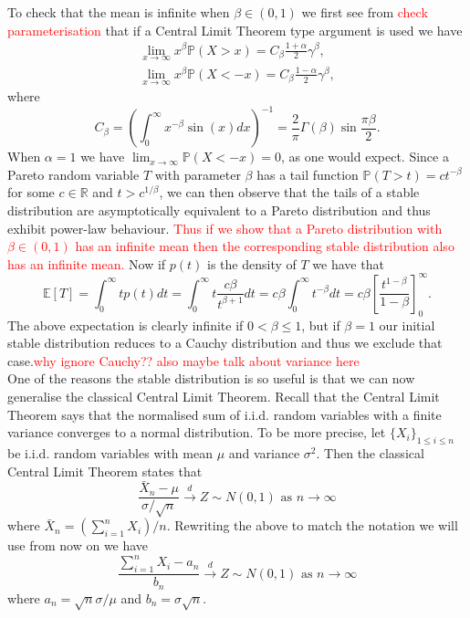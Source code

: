 \documentclass[honours,12pt]{UNSWthesis}
\newcommand{\R}{\mathbb{R}}
\newcommand{\PP}{\mathbb{P}}
\newcommand{\E}{\mathbb{E}}
\newcommand{\1}{\mathbf 1}
\numberwithin{equation}{section}
\theoremstyle{definition}
\theoremstyle{remark}
\begin{document}
\noindent To check that the mean is infinite when $\beta \in (0,1)$ we first see from \cite{JanickiWeron1994}\textcolor{red}{check parameterisation} that if a Central Limit Theorem type argument is used we have
\begin{align}
\lim_{x\to\infty} x^\beta\PP(X>x)=C_\beta\frac{1+\alpha}{2}\gamma^\beta,\\
\lim_{x\to\infty} x^\beta\PP(X<-x)=C_\beta\frac{1-\alpha}{2}\gamma^\beta,
\end{align}
\noindent where
\[
	C_\beta=\left(\int^\infty_0 x^{-\beta} \sin(x) dx  \right)^{-1}=\frac{2}{\pi}\Gamma(\beta)\sin\frac{\pi\beta}{2}.
\]
\noindent When $\alpha=1$ we have $\lim_{x\to\infty}\PP(X<-x)=0$, as one would expect. Since a Pareto random variable $T$ with parameter $\beta$ has a tail function $\PP(T>t)=ct^{-\beta}$ for some $c\in \R$ and $t>c^{1/\beta}$, we can then observe that the tails of a stable distribution are asymptotically equivalent to a Pareto distribution and thus exhibit power-law behaviour. \textcolor{red}{Thus if we show that a Pareto distribution with $\beta \in (0,1)$ has an infinite mean then the corresponding stable distribution also has an infinite mean.} Now if $p(t)$ is the density of $T$ we have that 
\[
	\E[T]=\int^\infty_0 tp(t)dt = \int^\infty_0 t\frac{c\beta}{t^{\beta+1}}dt = c\beta\int^\infty_0 t^{-\beta}dt = c\beta \left[\frac{t^{1-\beta}}{1-\beta}\right]^\infty_0.
\]
The above expectation is clearly infinite if $0<\beta\leq1$, but if $\beta=1$ our initial stable distribution reduces to a Cauchy distribution and thus we exclude that case.\textcolor{red}{why ignore Cauchy?? also maybe talk about variance here}\\

One of the reasons the stable distribution is so useful is that we can now generalise the classical Central Limit Theorem. Recall that the Central Limit Theorem says that the normalised sum of i.i.d. random variables with a finite variance converges to a normal distribution. To be more precise, let $\{X_i\}_{1\leq i \leq n}$ be i.i.d. random variables with mean $\mu$ and variance $\sigma^2$. Then the classical Central Limit Theorem states that
\[
	\frac{\bar{X}_n-\mu}{\sigma/\sqrt{n}} \overset{d}{\to}Z \sim N(0,1) \textrm{ as 				$n\to\infty$}
\]
where $\bar{X}_n=(\sum^n_{i=1}X_i)/n$. Rewriting the above to match the notation we will use from now on we have
\[
	\frac{\sum^n_{i=1}X_i-a_n}{b_n} \overset{d}{\to}Z \sim N(0,1) \textrm{ as $n\to\infty$}
\]
where $a_n=\sqrt{n}\sigma/\mu$ and $b_n=\sigma\sqrt{n}.$\\
\end{document}
